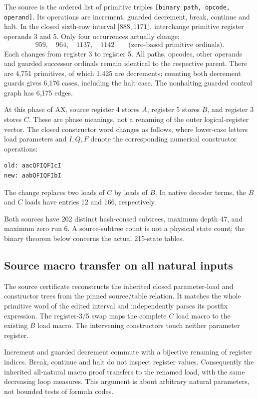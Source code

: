 \documentclass[11pt,a4paper]{article}
\theoremstyle{remark}\newtheorem{remark}[theorem]{Remark}
\begin{document}
The source is the ordered list of primitive triples
\texttt{[binary path, opcode, operand]}. Its operations are increment,
guarded decrement, break, continue and halt. In the closed sixth-row
interval $[888,1171)$, interchange primitive register operands 3 and 5.
Only four occurrences actually change:
\[
 959,\quad 964,\quad 1137,\quad 1142
 \qquad\text{(zero-based primitive ordinals).}
\]
Each changes from register 3 to register 5. All paths, opcodes, other
operands and guarded successor ordinals remain identical to the respective
parent. There are 4,751 primitives, of which 1,425 are decrements; counting
both decrement guards gives 6,176 cases, including the halt case.
The nonhalting guarded control graph has 6,175 edges.

At this phase of AX, source register 4 stores $A$, register 5 stores $B$,
and register 3 stores $C$. These are phase meanings, not a renaming of
the outer logical-register vector. The closed constructor word changes as
follows, where lower-case letters load parameters and $I,Q,F$ denote
the corresponding numerical constructor operations:
\begin{lstlisting}
old: aacQFIQFIcI
new: aabQFIQFIbI
\end{lstlisting}
The change replaces two loads of $C$ by loads of $B$. In native decoder
terms, the $B$ and $C$ loads have entries 12 and 166, respectively.

Both sources have 202 distinct hash-consed subtrees, maximum depth 47,
and maximum zero run 6. A source-subtree count is not a physical
state count; the binary theorem below concerns the actual 215-state
tables.

\subsection{Source macro transfer on all natural inputs}

The source certificate reconstructs the inherited closed parameter-load and
constructor trees from the pinned source/table relation. It matches the
whole primitive word of the edited interval and independently parses its
postfix expression. The register-3/5 swap maps the complete $C$ load
macro to the existing $B$ load macro. The intervening constructors touch
neither parameter register.

Increment and guarded decrement commute with a bijective renaming of
register indices. Break, continue and halt do not inspect register values.
Consequently the inherited all-natural macro proof transfers to the
renamed load, with the same decreasing loop measures. This argument is
about arbitrary natural parameters, not bounded tests of formula codes.
\end{document}
